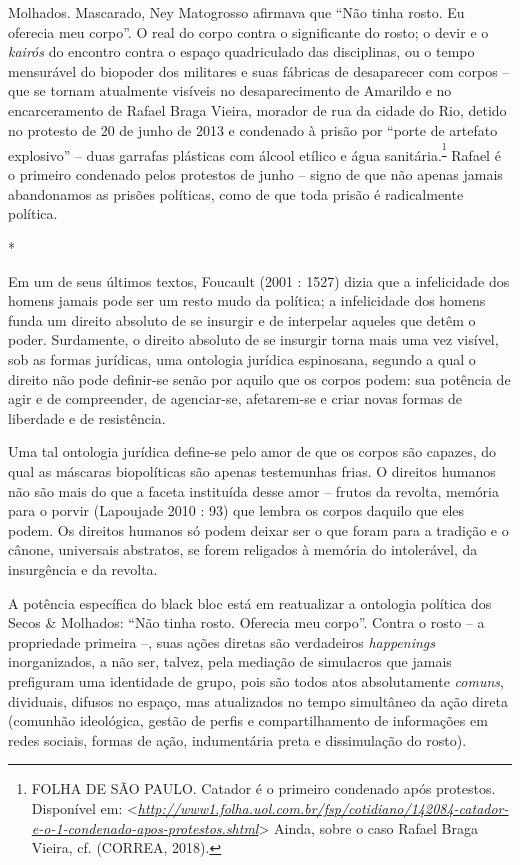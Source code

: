 Molhados. Mascarado, Ney Matogrosso afirmava que ``Não tinha rosto. Eu
oferecia meu corpo''. O real do corpo contra o significante do rosto; o
devir e o \emph{kairós} do encontro contra o espaço quadriculado das
disciplinas, ou o tempo mensurável do biopoder dos militares e suas
fábricas de desaparecer com corpos -- que se tornam atualmente visíveis
no desaparecimento de Amarildo e no encarceramento de Rafael Braga
Vieira, morador de rua da cidade do Rio, detido no protesto de 20 de
junho de 2013 e condenado à prisão por ``porte de artefato explosivo''
-- duas garrafas plásticas com álcool etílico e água
sanitária.\textsuperscript{\footnote{FOLHA DE SÃO PAULO. Catador é o
  primeiro condenado após protestos. Disponível em:
  \textless{}\href{http://www1.folha.uol.com.br/fsp/cotidiano/142084-catador-e-o-1-condenado-apos-protestos.shtml}{\emph{http://www1.folha.uol.com.br/fsp/cotidiano/142084-catador-e-o-1-condenado-apos-protestos.shtml}}\textgreater{}
  Ainda, sobre o caso Rafael Braga Vieira, cf. (CORREA, 2018).}} Rafael
é o primeiro condenado pelos protestos de junho -- signo de que não
apenas jamais abandonamos as prisões políticas, como de que toda prisão
é radicalmente política.

*

Em um de seus últimos textos, Foucault (2001 : 1527) dizia que a
infelicidade dos homens jamais pode ser um resto mudo da política; a
infelicidade dos homens funda um direito absoluto de se insurgir e de
interpelar aqueles que detêm o poder. Surdamente, o direito absoluto de
se insurgir torna mais uma vez visível, sob as formas jurídicas, uma
ontologia jurídica espinosana, segundo a qual o direito não pode
definir-se senão por aquilo que os corpos podem: sua potência de agir e
de compreender, de agenciar-se, afetarem-se e criar novas formas de
liberdade e de resistência.

Uma tal ontologia jurídica define-se pelo amor de que os corpos são
capazes, do qual as máscaras biopolíticas são apenas testemunhas frias.
O direitos humanos não são mais do que a faceta instituída desse amor --
frutos da revolta, memória para o porvir (Lapoujade 2010 : 93) que
lembra os corpos daquilo que eles podem. Os direitos humanos só podem
deixar ser o que foram para a tradição e o cânone, universais abstratos,
se forem religados à memória do intolerável, da insurgência e da
revolta.

A potência específica do black bloc está em reatualizar a ontologia
política dos Secos \& Molhados: ``Não tinha rosto. Oferecia meu corpo''.
Contra o rosto -- a propriedade primeira --, suas ações diretas são
verdadeiros \emph{happenings} inorganizados, a não ser, talvez, pela
mediação de simulacros que jamais prefiguram uma identidade de grupo,
pois são todos atos absolutamente \emph{comuns}, dividuais, difusos no
espaço, mas atualizados no tempo simultâneo da ação direta (comunhão
ideológica, gestão de perfis e compartilhamento de informações em redes
sociais, formas de ação, indumentária preta e dissimulação do rosto).

